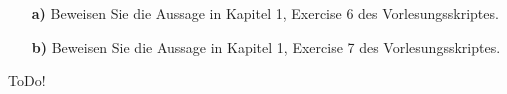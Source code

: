 
\begin{exercise}

\begin{itemize}
  \item[\textbf{a)}] Beweisen Sie die Aussage in Kapitel 1, Exercise 6 des Vorlesungsskriptes.
  \item[\textbf{b)}] Beweisen Sie die Aussage in Kapitel 1, Exercise 7 des Vorlesungsskriptes.
\end{itemize}

\end{exercise}


\begin{solution}

ToDo!

\end{solution}

